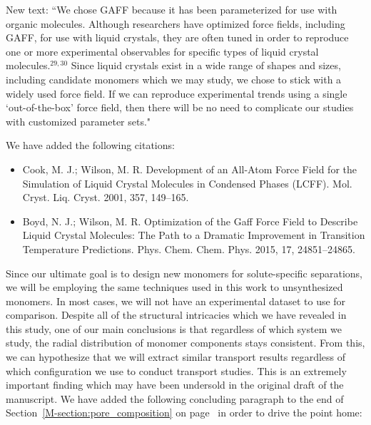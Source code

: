 \documentclass{article}
\begin{document}
\begin{enumerate}
    New text: ``We chose GAFF because it has been parameterized for use with
    organic molecules. Although researchers have optimized force fields, including
    GAFF, for use with liquid crystals, they are often tuned in order to
    reproduce one or more experimental observables for specific types of liquid 
    crystal molecules.$^{29,30}$ Since liquid crystals exist in a wide range of shapes and
    sizes, including candidate monomers which we may study, we chose to stick with
    a widely used force field. If we can reproduce experimental trends using a 
    single `out-of-the-box' force field, then there will be no need to complicate
    our studies with customized parameter sets."

    We have added the following citations:
    \begin{itemize}
    \item Cook, M. J.; Wilson, M. R. Development of an All-Atom Force Field for the Simulation
    of Liquid Crystal Molecules in Condensed Phases (LCFF). Mol. Cryst. Liq. Cryst.
    2001, 357, 149–165.
    \item Boyd, N. J.; Wilson, M. R. Optimization of the Gaff Force Field to Describe Liquid
    Crystal Molecules: The Path to a Dramatic Improvement in Transition Temperature
    Predictions. Phys. Chem. Chem. Phys. 2015, 17, 24851–24865.
    \end{itemize}

    Since our ultimate goal is to design new monomers for solute-specific
    separations, we will be employing the same techniques used in this work to
    unsynthesized monomers. In most cases, we will not have an experimental dataset
    to use for comparison. Despite all of the structural intricacies which we have
    revealed in this study, one of our main conclusions is that regardless of which
    system we study, 
    the radial distribution of monomer components stays
    consistent. From this, we can hypothesize that we will extract similar
    transport results regardless of which configuration we use to conduct
    transport studies. This is an extremely important finding which may have
    been undersold in the original draft of the manuscript. We have added the
    following concluding paragraph to the end of
    Section~\ref{M-section:pore_composition} on
    page~\pageref{M-addition:pore_composition} in order to drive the point home:


\end{enumerate}
\end{document}
